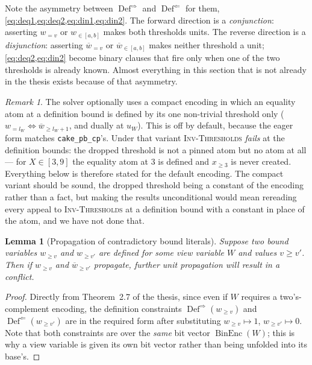 \documentclass[11pt,a4paper]{article}
\theoremstyle{plain}
\newtheorem{lemmaT}{Lemma}
\theoremstyle{definition}
\theoremstyle{remark}
\newtheorem*{remark}{Remark}
\newcommand{\fname}[1]{\ensuremath{\operatorname{#1}}}
\newcommand{\BinEnc}{\fname{BinEnc}}
\newcommand{\Def}{\fname{Def}}
\newcommand{\atge}[2]{#1_{\geq #2}}
\newcommand{\ateq}[2]{#1_{= #2}}
\newcommand{\atin}[3]{#1_{\in[#2,#3]}}
\newcommand{\natge}[2]{\overline{#1}_{\geq #2}}
\newcommand{\nateq}[2]{\overline{#1}_{= #2}}
\newcommand{\natin}[3]{\overline{#1}_{\in[#2,#3]}}
\newcommand{\inv}[1]{\textnormal{\textsc{Inv-#1}}}
\newcommand{\code}[1]{\texttt{#1}}
\newcommand{\invThresholds}{\inv{Thresholds}}
\begin{document}
Note the asymmetry between
$\Def^{\Rightarrow}$ and $\Def^{\Leftarrow}$ for them,
\cref{eq:deq1,eq:deq2,eq:din1,eq:din2}.  The forward direction is
a \emph{conjunction}: asserting $\ateq{w}{v}$ or $\atin{w}{a}{b}$ makes both
thresholds units.  The reverse direction is a \emph{disjunction}: asserting
$\nateq{w}{v}$ or $\natin{w}{a}{b}$ makes neither threshold a
unit; \cref{eq:deq2,eq:din2} become binary clauses that fire only when one of
the two thresholds is already known.  Almost everything in this section that is not
already in the thesis exists because of that asymmetry.

\begin{remark}
The solver optionally uses a compact encoding in which an equality atom at a
definition bound is defined by its one non-trivial threshold only
($\ateq{w}{l_W}\Leftrightarrow\natge{w}{l_W+1}$, and dually at
$u_W$).  This is off by default, because the eager form matches
\code{cake\_pb\_cp}'s.  Under that variant \invThresholds{} \emph{fails} at the
definition bounds: the dropped threshold is not a pinned atom but no atom at all ---
for $X\in[3,9]$ the equality atom at $3$ is defined and $\atge{x}{3}$ is never
created.  Everything below is therefore stated for the default encoding.  The
compact variant should be sound, the dropped threshold being a constant of the
encoding rather than a fact, but making the results unconditional would mean
rereading every appeal to \invThresholds{} at a definition bound with a constant in
place of the atom, and we have not done that.
\end{remark}

\begin{lemmaT}[Propagation of contradictory bound literals]
\label{lem:contra-bounds}
Suppose two bound variables $\atge{w}{v}$ and $\atge{w}{v'}$ are defined for
some view variable $W$ and values $v\geq v'$.  Then if $\atge{w}{v}$ and
$\natge{w}{v'}$ propagate, further unit propagation will result in a
conflict.
\end{lemmaT}

\begin{proof}
Directly from Theorem~2.7 of the thesis, since even if $W$ requires a
two's-complement encoding, the definition constraints
$\Def^{\Rightarrow}(\atge{w}{v})$ and $\Def^{\Leftarrow}(\atge{w}{v'})$ are in
the required form after substituting $\atge{w}{v}\mapsto 1$,
$\atge{w}{v'}\mapsto 0$.  Note that both constraints are over the \emph{same}
bit vector $\BinEnc(W)$; this is why a view variable is given its own bit
vector rather than being unfolded into its base's.
\end{proof}
\end{document}
